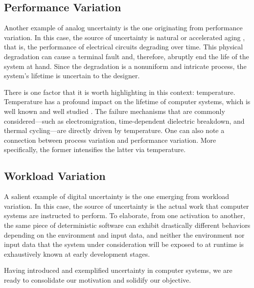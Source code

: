 \subsection{Performance Variation}

Another example of analog uncertainty is the one originating from performance
variation. In this case, the source of uncertainty is natural or accelerated
aging \cite{jedec2016}, that is, the performance of electrical circuits
degrading over time. This physical degradation can cause a terminal fault and,
therefore, abruptly end the life of the system at hand. Since the degradation is
a nonuniform and intricate process, the system's lifetime is uncertain to the
designer.

There is one factor that it is worth highlighting in this context: temperature.
Temperature has a profound impact on the lifetime of computer systems, which is
well known and well studied \cite{jedec2016}. The failure mechanisms that are
commonly considered---such as electromigration, time-dependent dielectric
breakdown, and thermal cycling---are directly driven by temperature. One can
also note a connection between process variation and performance variation. More
specifically, the former intensifies the latter via temperature.

\subsection{Workload Variation}

A salient example of digital uncertainty is the one emerging from workload
variation. In this case, the source of uncertainty is the actual work that
computer systems are instructed to perform. To elaborate, from one activation to
another, the same piece of deterministic software can exhibit drastically
different behaviors depending on the environment and input data, and neither the
environment nor input data that the system under consideration will be exposed
to at runtime is exhaustively known at early development stages.

\conclusioncut
Having introduced and exemplified uncertainty in computer systems, we are ready
to consolidate our motivation and solidify our objective.
